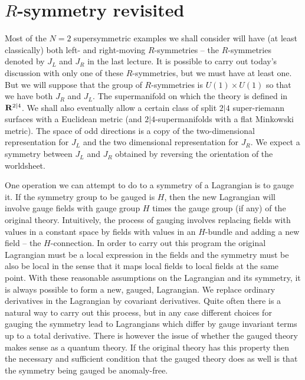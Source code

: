 \section{$R$-symmetry revisited}
Most of the $N=2$ supersymmetric examples we shall consider will have
(at least classically) both left- and right-moving $R$-symmetries --
the $R$-symmetries denoted by $J_L$ and $J_R$ in the last lecture.
It is possible to carry out today's  discussion with only one of
these $R$-symmetries, but we must have at least one.
But we will suppose that the group of $R$-symmetries is $U(1)\times U(1)$
so that we have both $J_R$ and $J_L$.  The supermanifold on
which the theory is defined in ${\bf R}^{2|4}$. We shall also
eventually allow a certain class of split $2|4$
super-riemann surfaces with a Euclidean metric (and
$2|4$-supermanifolds with a flat Minkowski metric). The space of odd 
directions is a copy of the two-dimensional representation for $J_L$
and the two dimensional representation for $J_R$.
We expect a symmetry between $J_L$ and $J_R$ obtained by reversing the
orientation of the worldsheet.

One operation we can attempt to do to a symmetry of a Lagrangian is to
gauge it. 
If the symmetry group to be gauged is $H$, then the new Lagrangian
will involve gauge fields  with gauge group $ H$ times the  gauge
group (if any) of the original theory.
Intuitively, the process of gauging  involves replacing fields with
values in a constant space by fields with values in an $H$-bundle and
adding a new field --  the $H$-connection. In order to carry out this
program the original Lagrangian must be a local expression in the
fields and the symmetry must be also be local in the sense that it
maps local fields to local fields at the same point.
With these reasonable assumptions on the Lagrangian and its symmetry,
it is always possible to form a new, gauged, Lagrangian.
We replace ordinary derivatives in the Lagrangian by covariant
derivatives. 
Quite often there is a natural way to carry out this process, but in
any case different choices for gauging the symmetry lead to
Lagrangians which differ by gauge invariant terms up to a total
derivative. 
There is however the issue of whether the gauged theory makes sense as
a quantum theory.  If the original theory has this property then the
necessary and sufficient condition that the gauged theory does as well
is that the symmetry being gauged be anomaly-free. 

